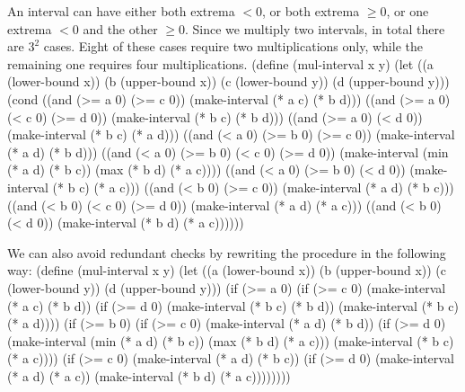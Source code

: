An interval can have either both extrema $<0$, or both extrema $\geq 0$, or one extrema $<0$ and the other $\geq 0$. Since we multiply two intervals, in total there are $3^2$ cases.  Eight of these cases require two multiplications only, while the remaining one requires four multiplications.
\begtt\scm
(define (mul-interval x y)
  (let ((a (lower-bound x))
        (b (upper-bound x))
        (c (lower-bound y))
        (d (upper-bound y)))
    (cond ((and (>= a 0) (>= c 0))
           (make-interval (* a c) (* b d)))
          ((and (>= a 0) (< c 0) (>= d 0))
           (make-interval (* b c) (* b d)))
          ((and (>= a 0) (< d 0))
           (make-interval (* b c) (* a d)))
          ((and (< a 0) (>= b 0) (>= c 0))
           (make-interval (* a d) (* b d)))
          ((and (< a 0) (>= b 0) (< c 0) (>= d 0))
           (make-interval (min (* a d) (* b c))
                          (max (* b d) (* a c))))
          ((and (< a 0) (>= b 0) (< d 0))
           (make-interval (* b c) (* a c)))
          ((and (< b 0) (>= c 0))
           (make-interval (* a d) (* b c)))
          ((and (< b 0) (< c 0) (>= d 0))
           (make-interval (* a d) (* a c)))
          ((and (< b 0) (< d 0))
           (make-interval (* b d) (* a c))))))
\endtt

We can also avoid redundant checks by rewriting the procedure in the following way:
\begtt\scm
(define (mul-interval x y)
  (let ((a (lower-bound x))
        (b (upper-bound x))
        (c (lower-bound y))
        (d (upper-bound y)))
    (if (>= a 0)
        (if (>= c 0)
            (make-interval (* a c) (* b d))
            (if (>= d 0)
                (make-interval (* b c) (* b d))
                (make-interval (* b c) (* a d))))
        (if (>= b 0)
            (if (>= c 0)
                (make-interval (* a d) (* b d))
                (if (>= d 0)
                    (make-interval (min (* a d) (* b c))
                                   (max (* b d) (* a c)))
                    (make-interval (* b c) (* a c))))
            (if (>= c 0)
                (make-interval (* a d) (* b c))
                (if (>= d 0)
                    (make-interval (* a d) (* a c))
                    (make-interval (* b d) (* a c))))))))
\endtt
